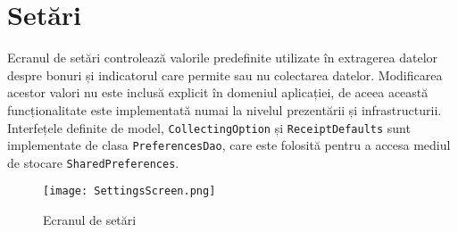 \section{Setări}

Ecranul de setări controlează valorile predefinite utilizate în extragerea datelor despre bonuri și indicatorul care permite sau nu colectarea datelor. Modificarea acestor valori nu este inclusă explicit în domeniul aplicației, de aceea această funcționalitate este implementată numai la nivelul prezentării și infrastructurii. Interfețele definite de model, \texttt{CollectingOption} și \texttt{ReceiptDefaults} sunt implementate de clasa \texttt{PreferencesDao}, care este folosită pentru a accesa mediul de stocare \texttt{SharedPreferences}. 

\begin{figure}[h]
  \centering
  \texttt{[image: SettingsScreen.png]}
  \caption{Ecranul de setări}
  \label{settingsScreen}
\end{figure}